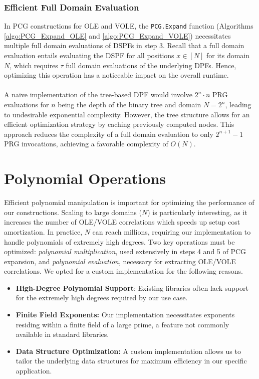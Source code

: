 \subsubsection{Efficient Full Domain Evaluation}
In PCG constructions for OLE and VOLE, the \texttt{PCG.Expand} function (Algorithms \ref{algo:PCG_Expand_OLE} and \ref{algo:PCG_Expand_VOLE}) necessitates multiple full domain evaluations of DSPFs in step 3. Recall that a full domain evaluation entails evaluating the DSPF for all positions $x \in [N]$ for its domain $N$, which requires $\tau$ full domain evaluations of the underlying DPFs. Hence, optimizing this operation has a noticeable impact on the overall runtime. 
\\\\
A naive implementation of the tree-based DPF would involve $2^n\cdot n$ PRG evaluations for $n$ being the depth of the binary tree and domain $N = 2^n$, leading to undesirable exponential complexity. However, the tree structure allows for an efficient optimization strategy by caching previously computed nodes. This approach reduces the complexity of a full domain evaluation to only $2^{n+1}-1$ PRG invocations, achieving a favorable complexity of $O(N)$.

\section{Polynomial Operations}
\label{sec:polyOperationsImpl}
Efficient polynomial manipulation is important for optimizing the performance of our constructions. Scaling to large domains ($N$) is particularly interesting, as it increases the number of OLE/VOLE correlations which speeds up setup cost amortization. In practice, $N$ can reach millions, requiring our implementation to handle polynomials of extremely high degrees. Two key operations must be optimized: \textit{polynomial multiplication}, used extensively in steps 4 and 5 of PCG expansion, and \textit{polynomial evaluation}, necessary for extracting OLE/VOLE correlations. We opted for a custom implementation for the following reasons.
\begin{itemize}
\item \textbf{High-Degree Polynomial Support}: Existing libraries often lack support for the extremely high degrees required by our use case.
\item \textbf{Finite Field Exponents:} Our implementation necessitates exponents residing within a finite field of a large prime, a feature not commonly available in standard libraries.
\item \textbf{Data Structure Optimization:} A custom implementation allows us to tailor the underlying data structures for maximum efficiency in our specific application.
\end{itemize}

